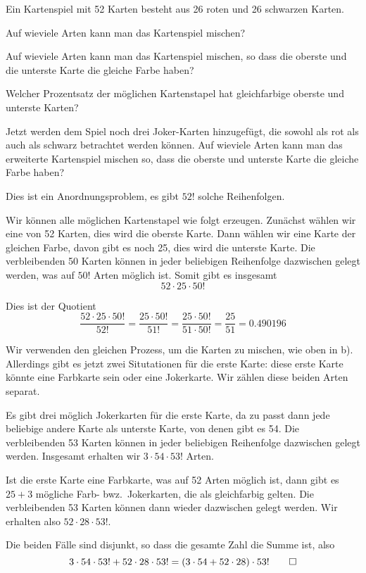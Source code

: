 Ein Kartenspiel mit 52 Karten besteht aus 26 roten und 26 schwarzen
Karten.
\begin{teilaufgaben}
\item
Auf wieviele Arten kann man das Kartenspiel mischen?
\item
Auf wieviele Arten kann man das Kartenspiel mischen, so dass die oberste
und die unterste Karte die gleiche Farbe haben?
\item 
Welcher Prozentsatz der möglichen Kartenstapel hat gleichfarbige
oberste und unterste Karten?
\item
Jetzt werden dem Spiel noch drei Joker-Karten hinzugefügt, die sowohl
als rot als auch als schwarz betrachtet werden können.
Auf wieviele Arten kann man das erweiterte Kartenspiel mischen so, 
dass die oberste und unterste Karte die gleiche Farbe haben?
\end{teilaufgaben}

\begin{loesung}
\begin{teilaufgaben}
\item
Dies ist ein Anordnungsproblem, es gibt $52!$ solche Reihenfolgen.
\item
Wir können alle möglichen Kartenstapel wie folgt erzeugen.
Zunächst wählen wir eine von 52 Karten, dies wird die oberste
Karte.
Dann wählen wir eine Karte der gleichen Farbe, davon gibt es noch 25,
dies wird die unterste Karte.
Die verbleibenden 50 Karten können in jeder beliebigen Reihenfolge
dazwischen gelegt werden, was auf $50!$ Arten möglich ist.
Somit gibt es insgesamt
\[
52\cdot 25\cdot 50!
\]
\item
Dies ist der Quotient
\[
\frac{52\cdot 25\cdot 50!}{52!}
=
\frac{25\cdot 50!}{51!}
=
\frac{25\cdot 50!}{51\cdot 50!}
=
\frac{25}{51}
=
0.490196%
\]
\item
Wir verwenden den gleichen Prozess, um die Karten zu mischen, wie oben in 
b).
Allerdings gibt es jetzt zwei Situtationen für die erste Karte: diese
erste Karte könnte eine Farbkarte sein oder eine Jokerkarte.
Wir zählen diese beiden Arten separat.

Es gibt drei möglich Jokerkarten für die erste Karte, da zu passt dann jede
beliebige andere Karte als unterste Karte, von denen gibt es 54.
Die verbleibenden 53 Karten können in jeder beliebigen Reihenfolge dazwischen 
gelegt werden. 
Insgesamt erhalten wir $3\cdot 54 \cdot 53!$ Arten.

Ist die erste Karte eine Farbkarte, was auf 52 Arten möglich ist, dann
gibt es $25+3$ mögliche Farb- bwz.~Jokerkarten, die als gleichfarbig
gelten.
Die verbleibenden 53 Karten können dann wieder dazwischen gelegt werden.
Wir erhalten also 
$52\cdot 28\cdot 53!$.

Die beiden Fälle sind disjunkt, so dass die gesamte Zahl die Summe ist,
also
\[
3\cdot 54 \cdot 53! + 52 \cdot 28 \cdot 53!
=
(3\cdot 54 + 52\cdot 28)\cdot 53!
\qedhere
\]
\end{teilaufgaben}
\end{loesung}

